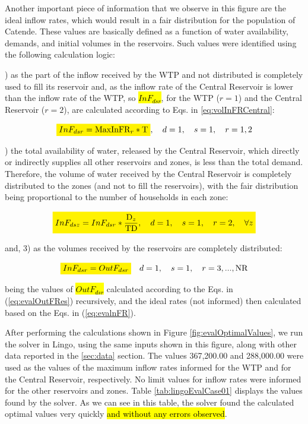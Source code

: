 \documentclass{singlecol}
\newcommand{\mathcolorbox}[2]{\colorbox{#1}{$\displaystyle #2$}}
\theoremstyle{TH}{
\newtheorem{lemma}{Lemma}
\newtheorem{theorem}[lemma]{Theorem}
\newtheorem{corrolary}[lemma]{Corrolary}
\newtheorem{conjecture}[lemma]{Conjecture}
\newtheorem{proposition}[lemma]{Proposition}
\newtheorem{claim}[lemma]{Claim}
\newtheorem{stheorem}[lemma]{Wrong Theorem}
\newtheorem{algorithm}{Algorithm}
}
\theoremstyle{THrm}{
\newtheorem{definition}{Definition}[section]
\newtheorem{question}{Question}[section]
\newtheorem{remark}{Remark}
\newtheorem{scheme}{Scheme}
}
\theoremstyle{THhit}{
\newtheorem{case}{Case}[section]
}
\begin{document}
Another important piece of information that we observe in this figure are the ideal inflow rates, which would result in a fair distribution for the population of Catende. These values are basically defined as a function of water availability, demands, and initial volumes in the reservoirs. Such values were identified using the following calculation logic:

) as the part of the inflow received by the WTP and not distributed is completely used to fill its reservoir and, as the inflow rate of the Central Reservoir is lower than the inflow rate of the WTP, so \hl{$InF_{dsr}$}, for the WTP ($r=1$) and the Central Reservoir  ($r=2$), are calculated according to Eqs. in \ref{eq:volInFRCentral}: 

\begin{equation}
	\mathcolorbox{yellow}{InF_{dsr} = \mathrm{MaxInFR}_r * \mathrm{T}}, \quad d = 1, \quad s = 1, \quad r = 1,2
	\label{eq:volInFRCentral}
\end{equation}

) the total availability of water, released by the Central Reservoir, which directly or indirectly supplies all other reservoirs and zones, is less than the total demand. Therefore, the volume of water received by the Central Reservoir is completely distributed to the zones (and not to fill the reservoirs), with the fair distribution being proportional to the number of households in each zone: 

\begin{equation}
	\mathcolorbox{yellow}{InF_{dsz} = InF_{dsr} * \dfrac{\mathrm{D}_z}{ \mathrm{TD}},
	\quad d = 1, \quad s = 1, \quad r = 2, \quad \forall z}  
\end{equation}

\noindent and, 3) as the volumes received by the reservoirs are completely distributed: 

\begin{equation}
	\mathcolorbox{yellow}{InF_{dsr} = OutF_{dsr}} \quad d = 1, \quad s = 1, \quad r=3, ..., \mathrm{NR}
\end{equation}

\noindent being the values of \hl{$OutF_{dsr}$} calculated according to the Eqs. in (\ref{eq:evalOutFRes}) recursively, and the ideal rates (not informed) then calculated based on the Eqs. in (\ref{eq:evalnFR}).

After performing the calculations shown in Figure \ref{fig:evalOptimalValues}, we run the solver in Lingo, using the same inputs shown in this figure, along with other data reported in the \ref{sec:data} section. The values 367,200.00 and 288,000.00 were used as the values of the maximum inflow rates informed for the WTP and for the Central Reservoir, respectively. No limit values for inflow rates were informed for the other reservoirs and zones. Table \ref{tab:lingoEvalCase01} displays the values found by the solver. As we can see in this table, the solver found the calculated optimal values very quickly \hl{and without any errors observed}. 
\end{document}
